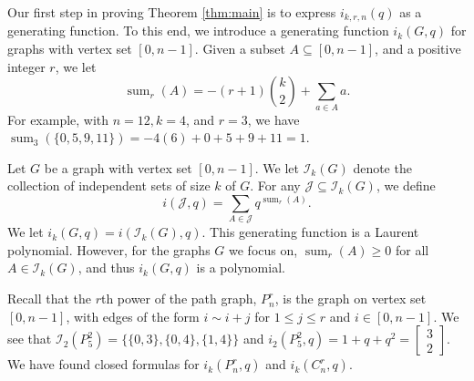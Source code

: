 \documentclass[12pt]{article}
\theoremstyle{definition}
\newcommand{\gau}[2]{\left[ \begin{array}{c} #1 \\ #2 \end{array} \right]}
\DeclareMathOperator{\ssum}{sum}
\begin{document}
Our first step in proving Theorem \ref{thm:main} is to express $i_{k,r,n}(q)$ as a generating function. To this end,
we introduce a generating function $i_k(G,q)$ for graphs with vertex set $[0,n-1].$  
Given a subset $A \subseteq [0,n-1]$, and a positive integer $r$, we let
\[ \ssum_r(A) =  - (r+1)\binom{k}{2} + \sum_{a \in A} a. \]
For example, with $n = 12, k =4$, and $r=3$, we have $\ssum_{3}(\{0,5,9,11 \}) = -4(6) + 0 + 5 + 9 + 11 = 1.$

Let $G$ be a graph with vertex set $[0,n-1]$. We let $\mathcal{I}_k(G)$ denote the collection of independent sets of size $k$ of $G.$ For any $\mathcal{J} \subseteq \mathcal{I}_k(G)$, 
we define \[i(\mathcal{J},q) = \sum_{A \in \mathcal{J}} q^{\ssum_r(A)}.\] 
We let $i_k(G, q) = i(\mathcal{I}_k(G),q).$ This generating function is a Laurent polynomial. However, for the graphs $G$ we focus on, $\ssum_r(A) \geq 0$ for all $A \in \mathcal{I}_k(G)$, and thus $i_k(G,q)$ is a polynomial.

Recall that the $r$th power of the path graph, $P_n^r$, is the graph on vertex set $[0,n-1]$, with edges of the form $i \sim i+j$ for $1\leq j \leq r$ and $i \in [0,n-1].$
We see that $\mathcal{I}_2(P_5^2) = \{\{0,3\}, \{0,4\}, \{1,4\}\}$ and $i_2(P^2_5,q) = 1+q+q^2 = \gau{3}{2}.$ We have found closed formulas for $i_k(P_n^r,q)$ and $i_k(C_n^r,q).$
\end{document}
